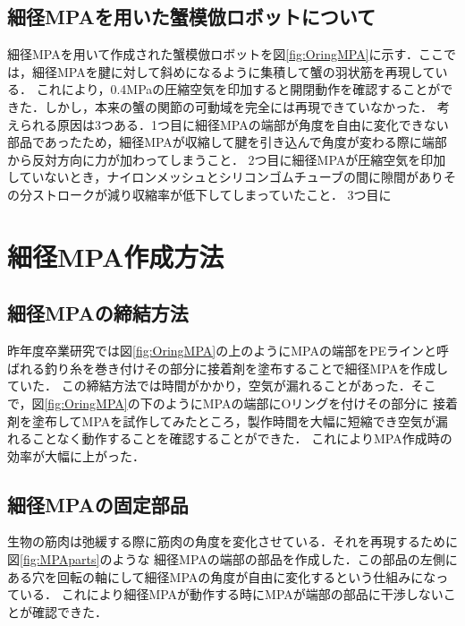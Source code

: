\documentclass{jarticle}
\begin{document}
\vspace*{-1mm}
\subsection{細径MPAを用いた蟹模倣ロボットについて}

細径MPAを用いて作成された蟹模倣ロボットを図\ref{fig:OringMPA}に示す．ここでは，細径MPAを腱に対して斜めになるように集積して蟹の羽状筋を再現している．
これにより，0.4MPaの圧縮空気を印加すると開閉動作を確認することができた．しかし，本来の蟹の関節の可動域を完全には再現できていなかった．
考えられる原因は3つある．1つ目に細径MPAの端部が角度を自由に変化できない部品であったため，細径MPAが収縮して腱を引き込んで角度が変わる際に端部から反対方向に力が加わってしまうこと．
2つ目に細径MPAが圧縮空気を印加していないとき，ナイロンメッシュとシリコンゴムチューブの間に隙間がありその分ストロークが減り収縮率が低下してしまっていたこと．
3つ目に

\vspace*{-2mm}
\section{細径MPA作成方法}

\vspace*{-1mm}
\subsection{細径MPAの締結方法}

昨年度卒業研究では図\ref{fig:OringMPA}の上のようにMPAの端部をPEラインと呼ばれる釣り糸を巻き付けその部分に接着剤を塗布することで細径MPAを作成していた．
この締結方法では時間がかかり，空気が漏れることがあった．そこで，図\ref{fig:OringMPA}の下のようにMPAの端部にOリングを付けその部分に
接着剤を塗布してMPAを試作してみたところ，製作時間を大幅に短縮でき空気が漏れることなく動作することを確認することができた．
これによりMPA作成時の効率が大幅に上がった．

\vspace*{-1mm}
\subsection{細径MPAの固定部品}

生物の筋肉は弛緩する際に筋肉の角度を変化させている．それを再現するために図\ref{fig:MPAparts}のような
細径MPAの端部の部品を作成した．この部品の左側にある穴を回転の軸にして細径MPAの角度が自由に変化するという仕組みになっている．
これにより細径MPAが動作する時にMPAが端部の部品に干渉しないことが確認できた．
\end{document}
